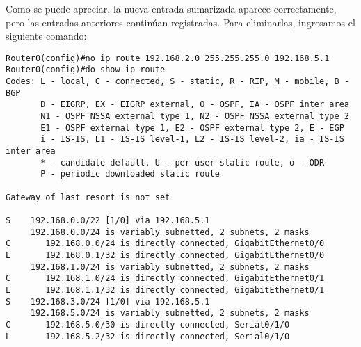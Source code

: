 \documentclass{article}
\begin{document}
Como se puede apreciar, la nueva entrada sumarizada aparece correctamente, pero las entradas anteriores contin\'uan registradas. Para eliminarlas, ingresamos el siguiente comando: \\
\begin{verbatim}
Router0(config)#no ip route 192.168.2.0 255.255.255.0 192.168.5.1
Router0(config)#do show ip route
Codes: L - local, C - connected, S - static, R - RIP, M - mobile, B - BGP
       D - EIGRP, EX - EIGRP external, O - OSPF, IA - OSPF inter area
       N1 - OSPF NSSA external type 1, N2 - OSPF NSSA external type 2
       E1 - OSPF external type 1, E2 - OSPF external type 2, E - EGP
       i - IS-IS, L1 - IS-IS level-1, L2 - IS-IS level-2, ia - IS-IS inter area
       * - candidate default, U - per-user static route, o - ODR
       P - periodic downloaded static route

Gateway of last resort is not set

S    192.168.0.0/22 [1/0] via 192.168.5.1
     192.168.0.0/24 is variably subnetted, 2 subnets, 2 masks
C       192.168.0.0/24 is directly connected, GigabitEthernet0/0
L       192.168.0.1/32 is directly connected, GigabitEthernet0/0
     192.168.1.0/24 is variably subnetted, 2 subnets, 2 masks
C       192.168.1.0/24 is directly connected, GigabitEthernet0/1
L       192.168.1.1/32 is directly connected, GigabitEthernet0/1
S    192.168.3.0/24 [1/0] via 192.168.5.1
     192.168.5.0/24 is variably subnetted, 2 subnets, 2 masks
C       192.168.5.0/30 is directly connected, Serial0/1/0
L       192.168.5.2/32 is directly connected, Serial0/1/0

\end{verbatim}
\end{document}
